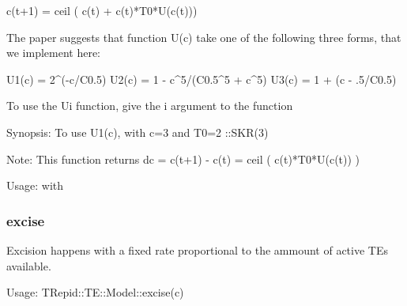 c(t+1) = ceil ( c(t) + c(t)*T0*U(c(t)))



The paper suggests that function U(c) take one of the following three
forms, that we implement here:



U1(c) = 2\^{}(-c/C0.5)
U2(c) = 1 - c\^{}5/(C0.5\^{}5 + c\^{}5)
U3(c) = 1 + (c - .5/C0.5)



To use the Ui function, give the i argument to the function



Synopsis: To use U1(c), with c=3 and T0=2 ::SKR(3)



Note: This function returns 
dc = c(t+1) - c(t) = ceil ( c(t)*T0*U(c(t)) )



Usage:
with

\subsubsection*{excise\label{excise}}


Excision happens with a fixed rate proportional to the ammount of
active TEs available.



Usage:
TRepid::TE::Model::excise(c)

